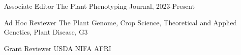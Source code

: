 
\begin{cvskills}

\cvskill
    {Associate Editor} %
    {The Plant Phenotyping Journal, 2023-Present}

  \cvskill
    {Ad Hoc Reviewer} %
    {The Plant Genome, Crop Science, Theoretical and Applied Genetics, Plant Disease, G3}

  \cvskill
    {Grant Reviewer} %
    {USDA NIFA AFRI}

\end{cvskills}
